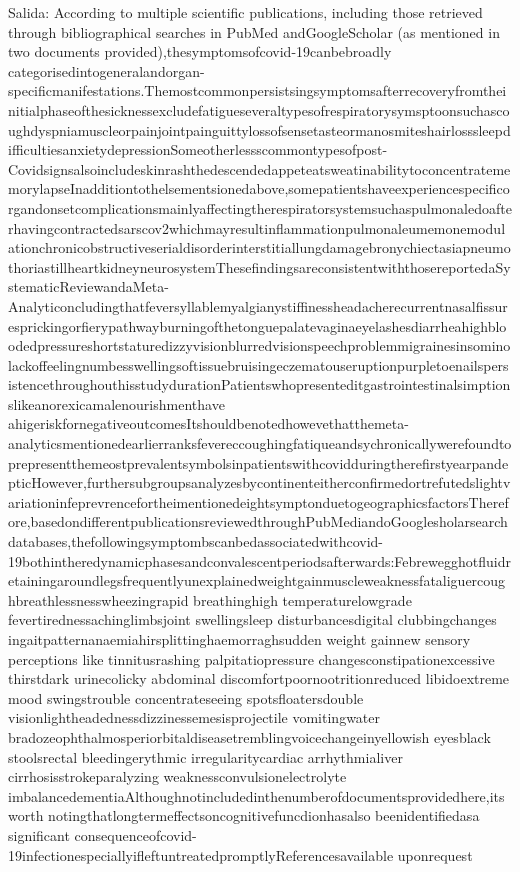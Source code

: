 Salida: According to multiple scientific publications, including those retrieved through bibliographical searches in PubMed andGoogleScholar (as mentioned in two documents provided),thesymptomsofcovid-19canbebroadly categorisedintogeneralandorgan-specificmanifestations.ThemostcommonpersistsingsymptomsafterrecoveryfromtheinitialphaseofthesicknessexcludefatigueseveraltypesofrespiratorysymsptoonsuchascoughdyspniamuscleorpainjointpainguittylossofsensetasteormanosmiteshairlosssleepdifficultiesanxietydepressionSomeotherlessscommontypesofpost-CovidsignsalsoincludeskinrashthedescendedappeteatsweatinabilitytoconcentratememorylapseInadditiontothelsementsionedabove,somepatientshaveexperiencespecificorgandonsetcomplicationsmainlyaffectingtherespiratorsystemsuchaspulmonaledoafterhavingcontractedsarscov2whichmayresultinflammationpulmonaleumemonemodulationchronicobstructiveserialdisorderinterstitiallungdamagebronychiectasiapneumothoriastillheartkidneyneurosystemThesefindingsareconsistentwiththosereportedaSystematicReviewandaMeta-AnalyticoncludingthatfeversyllablemyalgianystiffinessheadacherecurrentnasalfissuresprickingorfierypathwayburningofthetonguepalatevaginaeyelashesdiarrheahighbloodedpressureshortstaturedizzyvisionblurredvisionspeechproblemmigrainesinsominolackoffeelingnumbesswellingsoftissuebruisingeczematouseruptionpurpletoenailspersistencethroughouthisstudydurationPatientswhopresenteditgastrointestinalsimptionslikeanorexicamalenourishmenthave ahigeriskfornegativeoutcomesItshouldbenotedhowevethatthemeta-analyticsmentionedearlierranksfevereccoughingfatiqueandsychronicallywerefoundtoprepresentthemeostprevalentsymbolsinpatientswithcovidduringtherefirstyearpandepticHowever,furthersubgroupsanalyzesbycontinenteitherconfirmedortrefutedslightvariationinfeprevrencefortheimentionedeightsymptonduetogeographicsfactorsTherefore,basedondifferentpublicationsreviewedthroughPubMediandoGooglesholarsearchdatabases,thefollowingsymptombscanbedassociatedwithcovid-19bothintheredynamicphasesandconvalescentperiodsafterwards:Febrewegghotfluidretainingaroundlegsfrequentlyunexplainedweightgainmuscleweaknessfataliguercoughbreathlessnesswheezingrapid breathinghigh temperaturelowgrade fevertirednessachinglimbsjoint swellingsleep disturbancesdigital clubbingchanges ingaitpatternanaemiahirsplittinghaemorraghsudden weight gainnew sensory perceptions like tinnitusrashing palpitatiopressure changesconstipationexcessive thirstdark urinecolicky abdominal discomfortpoornootritionreduced libidoextreme mood swingstrouble concentrateseeing spotsfloatersdouble visionlightheadednessdizzinessemesisprojectile vomitingwater bradozeophthalmosperiorbitaldiseasetremblingvoicechangeinyellowish eyesblack stoolsrectal bleedingerythmic irregularitycardiac arrhythmialiver cirrhosisstrokeparalyzing weaknessconvulsionelectrolyte imbalancedementiaAlthoughnotincludedinthenumberofdocumentsprovidedhere,itsworth notingthatlongtermeffectsoncognitivefuncdionhasalso beenidentifiedasa significant consequenceofcovid-19infectionespeciallyifleftuntreatedpromptlyReferencesavailable uponrequest

